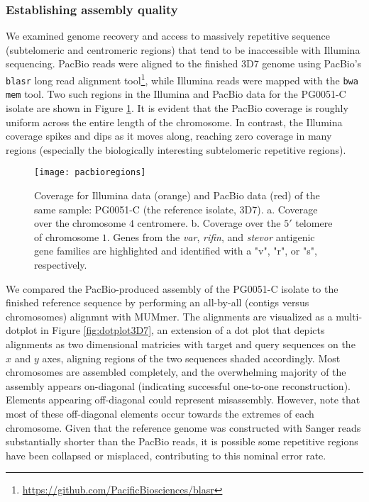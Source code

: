 \subsubsection{Establishing assembly quality}
We examined genome recovery and access to massively repetitive sequence (subtelomeric and centromeric regions) that tend to be inaccessible with Illumina sequencing.  PacBio reads were aligned to the finished 3D7 genome using PacBio's \texttt{blasr} long read alignment tool\footnote{\url{https://github.com/PacificBiosciences/blasr}}, while Illumina reads were mapped with the \texttt{bwa mem} tool.  Two such regions in the Illumina and PacBio data for the PG0051-C isolate are shown in Figure \ref{fig:pacbioregions}.  It is evident that the PacBio coverage is roughly uniform across the entire length of the chromosome. In contrast, the Illumina coverage spikes and dips as it moves along, reaching zero coverage in many regions (especially the biologically interesting subtelomeric repetitive regions).

\begin{figure}[h!]
  \centering
    \texttt{[image: pacbioregions]}
  \caption{Coverage for Illumina data (orange) and PacBio data (red) of the same sample: PG0051-C (the reference isolate, 3D7).  a. Coverage over the chromosome $4$ centromere.  b. Coverage over the $5'$ telomere of chromosome $1$.  Genes from the \textit{var}, \textit{rifin}, and \textit{stevor} antigenic gene families are highlighted and identified with a "v", "r", or "s", respectively.}
  \label{fig:pacbioregions}
\end{figure}

We compared the PacBio-produced assembly of the PG0051-C isolate to the finished reference sequence by performing an all-by-all (contigs versus chromosomes) alignmnt with MUMmer\cite{Versatileandopens:2004dy}.  The alignments are visualized as a multi-dotplot in Figure \ref{fig:dotplot3D7}, an extension of a dot plot that depicts alignments as two dimensional matricies with target and query sequences on the $x$ and $y$ axes, aligning regions of the two sequences shaded accordingly\cite{Gibbs:1970jf}.  Most chromosomes are assembled completely, and the overwhelming majority of the assembly appears on-diagonal (indicating successful one-to-one reconstruction).  Elements appearing off-diagonal could represent misassembly.  However, note that most of these off-diagonal elements occur towards the extremes of each chromosome.  Given that the reference genome was constructed with Sanger reads substantially shorter than the PacBio reads, it is possible some repetitive regions have been collapsed or misplaced, contributing to this nominal error rate.

